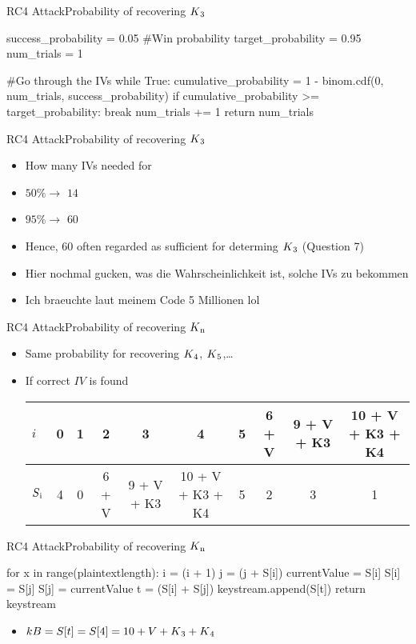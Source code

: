 \documentclass[
	aspectratio=169,	%
	onlytextwidth,		%
	t,					%
	]{beamer}
\begin{document}
\begin{frame}[fragile]{RC4 Attack}{Probability of recovering $K\textsubscript{3}$}
	\begin{python}
		success_probability = 0.05
		#Win probability
		target_probability = 0.95
		num_trials = 1

		#Go through the IVs
		while True:
			cumulative_probability = 1 - binom.cdf(0, num_trials, success_probability)
			if cumulative_probability >= target_probability:
				break
			num_trials += 1
		return num_trials
	\end{python}
\end{frame}

\begin{frame}[fragile]{RC4 Attack}{Probability of recovering $K\textsubscript{3}$}
	\begin{itemize}
		\item How many IVs needed for 
		\item $50\% \rightarrow$ $14$
		\item $95\% \rightarrow$ $60$
		\item Hence, $60$ often regarded as sufficient for determing $K\textsubscript{3}$ (Question 7)
		\item Hier nochmal gucken, was die Wahrscheinlichkeit ist, solche IVs zu bekommen 
		\item Ich braeuchte laut meinem Code 5 Millionen lol
	\end{itemize}
\end{frame}

\begin{frame}[fragile]{RC4 Attack}{Probability of recovering $K\textsubscript{n}$}
	\begin{itemize}
		\item Same probability for recovering $K\textsubscript{4}$, $K\textsubscript{5}$,\dots
		\item If correct $IV$ is found
		\small
		\begin{tabular}{l|c|c|c|c|c|c|c|c|c}
		$i$ & 0 & 1 & 2 & 3 & 4 & 5 & 6 + V & 9 + V + K3 & 10 + V + K3 + K4\\
		\hline
		$S\textsubscript{i}$ & 4 & 0 & 6 + V & 9 + V + K3 & 10 + V + K3 + K4 & 5 & 2 & 3 & 1\\
		\end{tabular}
		\normalsize
	\end{itemize}
\end{frame}

\begin{frame}[fragile]{RC4 Attack}{Probability of recovering $K\textsubscript{n}$}
	\small
	\begin{python}
		for x in range(plaintextlength):
			i = (i + 1) %
			j = (j + S[i]) %
			currentValue = S[i]
			S[i] = S[j]
			S[j] = currentValue
			t = (S[i] + S[j]) %
			keystream.append(S[t])
		return keystream
	\end{python}
	\normalsize

	\begin{itemize}
		\item $kB = S[t] = S[4] = 10 + V + K\textsubscript{3} + K\textsubscript{4}$
	\end{itemize}
\end{frame}
\end{document}
